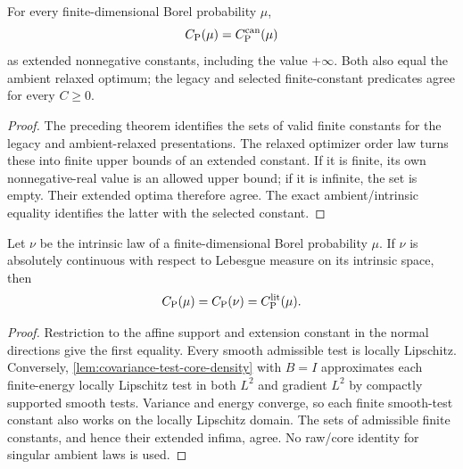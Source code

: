 \begin{theorem}
  \label{thm:legacy-canonical-constant-comparison}
  \leanok
  For every finite-dimensional Borel probability $\mu$,
  \[
    C_{\mathrm P}(\mu)=C_{\mathrm P}^{\mathrm{can}}(\mu)
  \]
  as extended nonnegative constants, including the value $+\infty$. Both also equal the ambient
  relaxed optimum; the legacy and selected finite-constant predicates agree for every $C\ge0$.
\end{theorem}
\begin{proof}
  \leanok
   The preceding theorem identifies the sets of valid finite constants for the legacy and
  ambient-relaxed presentations. The relaxed optimizer order law turns these into finite upper
  bounds of an extended constant. If it is finite, its own nonnegative-real value is an allowed
  upper bound; if it is infinite, the set is empty. Their extended optima therefore agree.  The exact
  ambient/intrinsic equality identifies the latter with the selected constant.
\end{proof}

\begin{theorem}
  \label{thm:smooth-lipschitz-constant-equivalence}
  \leanok
  Let $\nu$ be the intrinsic law of a finite-dimensional Borel probability $\mu$.  If $\nu$ is
  absolutely continuous with respect to Lebesgue measure on its intrinsic space, then
  \[
    C_{\mathrm P}(\mu)=C_{\mathrm P}(\nu)=C_{\mathrm P}^{\mathrm{lit}}(\mu).
  \]
\end{theorem}
\begin{proof}
  \leanok
  Restriction to the affine support and extension constant in the normal directions give
  the first equality. Every smooth admissible test is locally Lipschitz. Conversely,
  \cref{lem:covariance-test-core-density} with $B=I$ approximates each finite-energy locally
  Lipschitz test in both $L^2$ and gradient $L^2$ by compactly supported smooth tests.
  Variance and energy converge, so each finite smooth-test constant also works on the
  locally Lipschitz domain. The sets of admissible finite constants, and hence their extended
  infima, agree. No raw/core identity for singular ambient laws is used.
\end{proof}

